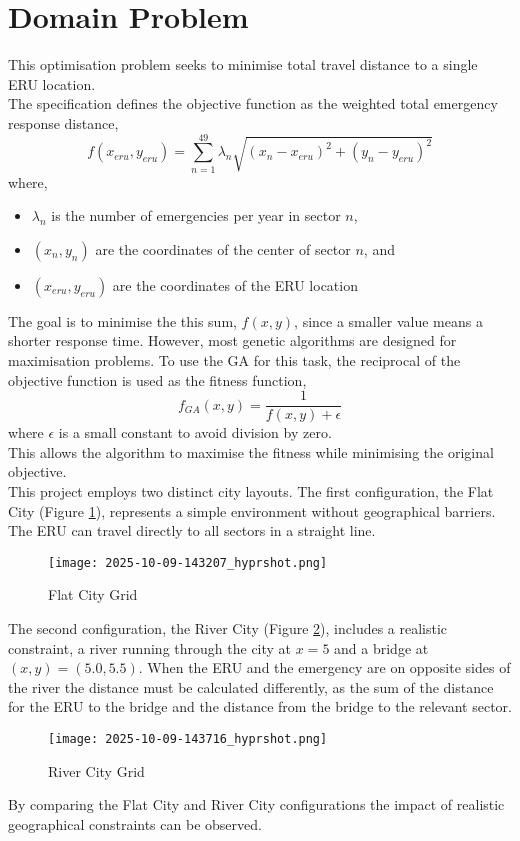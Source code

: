 \documentclass[12pt,a4paper]{article}
\begin{document}
\section{Domain Problem}
This optimisation problem seeks to minimise total travel distance to a single ERU location.\\
The specification defines the objective function as the weighted total emergency response distance,
$$f(x_{eru},y_{eru})=\sum_{n=1}^{49}\lambda_n\sqrt{(x_n-x_{eru})^2+(y_n-y_{eru})^2}$$
where,
\begin{itemize}
	\item $\lambda_n$ is the number of emergencies per year in sector $n$,
	\item $(x_n,y_n)$ are the coordinates of the center of sector $n$, and
	\item $(x_{eru},y_{eru})$ are the coordinates of the ERU location
\end{itemize}
The goal is to minimise the this sum, $f(x,y)$, since a smaller value means a shorter response time. However, most genetic algorithms are designed for maximisation problems. To use the GA for this task, the reciprocal of the objective function is used as the fitness function,
$$f_{GA}(x,y)=\dfrac{1}{f(x,y)+\epsilon}$$
where $\epsilon$ is a small constant to avoid division by zero.\\
This allows the algorithm to maximise the fitness while minimising the original objective.\\

This project employs two distinct city layouts. The first configuration, the Flat City (Figure \ref{fig:Flat City}), represents a simple environment without geographical barriers. The ERU can travel directly to all sectors in a straight line.\\
\begin{figure}[H]
	\centering
	\texttt{[image: 2025-10-09-143207\_hyprshot.png]}
	\caption{Flat City Grid}
	\label{fig:Flat City}
\end{figure}
The second configuration, the River City (Figure \ref{fig:River City}), includes a realistic constraint, a river running through the city at $x=5$ and a bridge at $(x,y)=(5.0,5.5)$. When the ERU and the emergency are on opposite sides of the river the distance must be calculated differently, as the sum of the distance for the ERU to the bridge and the distance from the bridge to the relevant sector.
\begin{figure}[H]
	\centering
	\texttt{[image: 2025-10-09-143716\_hyprshot.png]}
	\caption{River City Grid}
	\label{fig:River City}
\end{figure}
By comparing the Flat City and River City configurations the impact of realistic geographical constraints can be observed. 
\end{document}
